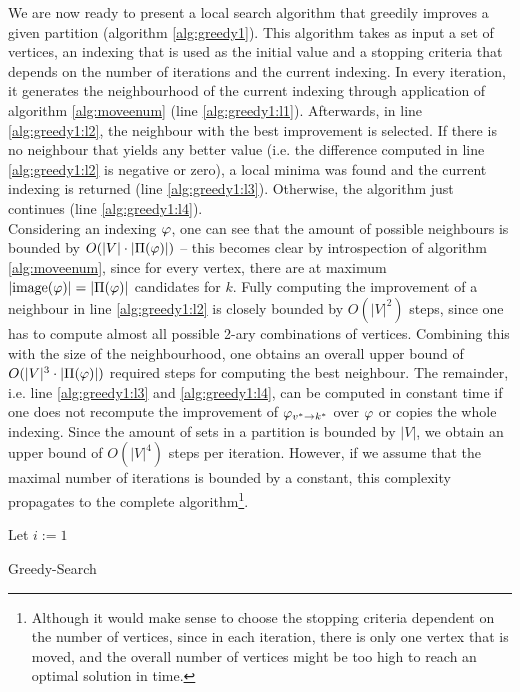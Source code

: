 We are now ready to present a local search algorithm that greedily improves a given partition (algorithm \ref{alg:greedy1}). This algorithm takes as input a set of vertices, an indexing that is used as the initial value and a stopping criteria that depends on the number of iterations and the current indexing. In every iteration, it generates the neighbourhood of the current indexing through application of algorithm \ref{alg:moveenum} (line \ref{alg:greedy1:l1}). Afterwards, in line \ref{alg:greedy1:l2}, the neighbour with the best improvement is selected. If there is no neighbour that yields any better value (i.e. the difference computed in line \ref{alg:greedy1:l2} is negative or zero), a local minima was found and the current indexing is returned (line \ref{alg:greedy1:l3}). Otherwise, the algorithm just continues (line \ref{alg:greedy1:l4}). \\
Considering an indexing $\idx$, one can see that the amount of possible neighbours is bounded by $O(|V| \cdot |\Pi(\varphi) |)$ -- this becomes clear by introspection of algorithm \ref{alg:moveenum}, since for every vertex, there are at maximum $|\mathrm{image}(\varphi)| = |\Pi(\varphi)|$ candidates for $k$. Fully computing the improvement of a neighbour in line \ref{alg:greedy1:l2} is closely bounded by $O(|V|^2)$ steps, since one has to compute almost all possible 2-ary combinations of vertices. Combining this with the size of the neighbourhood, one obtains an overall upper bound of $O(|V|^3 \cdot |\Pi(\varphi)|)$ required steps for computing the best neighbour. The remainder, i.e. line \ref{alg:greedy1:l3} and \ref{alg:greedy1:l4}, can be computed in constant time if one does not recompute the improvement of $\varphi_{v^*\rightarrow k^*}$ over $\idx$ or copies the whole indexing. Since the amount of sets in a partition is bounded by $|V|$, we obtain an upper bound of $O(|V|^4)$ steps per iteration. However, if we assume that the maximal number of iterations is bounded by a constant, this complexity propagates to the complete algorithm\footnote{Although it would make sense to choose the stopping criteria dependent on the number of vertices, since in each iteration, there is only one vertex that is moved, and the overall number of vertices might be too high to reach an optimal solution in time.}.

\begin{algorithm}[H]
    \SetAlgoLined
    \DontPrintSemicolon
    Let $i := 1$ \;
    \Return{$\idx$}
    \caption{Greedy-Search} \label{alg:greedy1}
\end{algorithm}


